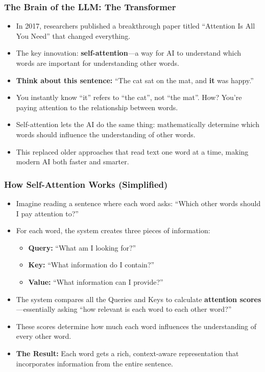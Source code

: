 \documentclass{beamer}
\begin{document}
\begin{frame}
    \frametitle{The Brain of the LLM: The Transformer}
    \begin{itemize}
        \item In 2017, researchers published a breakthrough paper titled ``Attention Is All You Need'' that changed everything.
        \item The key innovation: \textbf{self-attention}---a way for AI to understand which words are important for understanding other words.
        \item \textbf{Think about this sentence:} ``The cat sat on the mat, and \textbf{it} was happy.''
        \item You instantly know ``it'' refers to ``the cat'', not ``the mat''. How? You're paying attention to the relationship between words.
        \item Self-attention lets the AI do the same thing: mathematically determine which words should influence the understanding of other words.
        \item This replaced older approaches that read text one word at a time, making modern AI both faster and smarter.
    \end{itemize}
\end{frame}

\begin{frame}
    \frametitle{How Self-Attention Works (Simplified)}
    \begin{itemize}
    \item Imagine reading a sentence where each word asks: ``Which other words should I pay attention to?''
        \item For each word, the system creates three pieces of information:
        \begin{itemize}
            \item \textbf{Query:} ``What am I looking for?''
            \item \textbf{Key:} ``What information do I contain?''
            \item \textbf{Value:} ``What information can I provide?''
        \end{itemize}
    \item The system compares all the Queries and Keys to calculate \textbf{attention scores}---essentially asking ``how relevant is each word to each other word?''
        \item These scores determine how much each word influences the understanding of every other word.
        \item \textbf{The Result:} Each word gets a rich, context-aware representation that incorporates information from the entire sentence.
    \end{itemize}
\end{frame}
\end{document}
